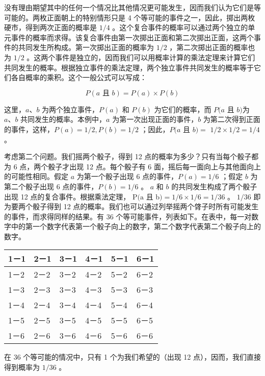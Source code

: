 没有理由期望其中的任何一个情况比其他情况更可能发生，因而我们认为它们是等可能的。两枚正面朝上的特别情形只是 4 个等可能的事件之一，因此，掷出两枚硬市，得到两次正面的概率是 $1 / 4$ 。这个复合事件的概率可以通过两个独立的单元事件的概率而求得。该复合事件由第一次掷出正面和第二次掷出正面，这两个事件的共同发生所构成。第一次掷出正面的概率为 $1 / 2$ ，第二次掷出正面的概率也为 $1 / 2$ 。这两个事件是独立的，因而我们可以用概率计算的乘法定理来计算它们共同发生的概率。根据独立事件的乘法定理，两个独立事件共同发生的概率等于它们各自概率的乘积。这个一般公式可以写成：

$$
P(a \text { 且 } b)=P(a) \times P(b)
$$

这里，$a 、 b$ 为两个独立事件，$P(a)$ 和 $P(b)$ 为它们的概率，而 $P(a$ 且 $b)$为 $a 、 b$ 共同发生的概率。本例中，$a$ 为第一次出现正面的事件，$b$ 为第二次得到正面的事件，这样，$P(a)=1 / 2, P(b)=1 / 2$ ；因此，$P(a$ 且 $b)=$ $1 / 2 \times 1 / 2=1 / 4$ 。

考虑第二个问题。我们摇两个骰子，得到 12 点的概率为多少？只有当每个骰子都为 6 点，两个骰子才出现 12 点。每个骰子有 6 面，摇后每一面向上与其他面向上的可能性相同。假定 $a$ 为第一个骰子出现 6 点的事件，$P(a)=1 / 6$ ；假定 $b$ 为第二个骰子出现 6 点的事件，$P(b)=1 / 6$ 。 $a$ 和 $b$ 的共同发生构成了两个骰子出现 12 点的复合事件。根据乘法定理， $\mathrm{P}(\mathrm{a}$ 且 b$)=1 / 6 \times 1 / 6=1 / 36$ 。 $1 / 36$ 即为要两个骰子得到 12 点的概率。我们也可以通过列举摇两个䏿子时所有可能发生的事件，而求得同样的结果。有 36 个等可能事件，列表如下。在表中，每一对数字中的第一个数字代表第一个骰子向上的数字，第二个数字代表第二个骰子向上的数字。

\begin{center}
\begin{tabular}{|l|l|l|l|l|l|}
\hline
1－1 & 2－1 & 3－1 & 4－1 & 5－1 & 6－1 \\
\hline
1－2 & 2－2 & 3－2 & 4－2 & 5－2 & 6－2 \\
\hline
1－3 & 2－3 & 3－3 & 4－3 & 5－3 & 6－3 \\
\hline
1－4 & 2－4 & 3－4 & 4－4 & 5－4 & 6－4 \\
\hline
1－5 & 2－5 & 3－5 & 4－5 & 5－5 & 6－5 \\
\hline
1－6 & 2－6 & 3－6 & 4－6 & 5－6 & 6－6 \\
\hline
\end{tabular}
\end{center}

在 36 个等可能的情况中，只有 1 个为我们希望的（出现 12 点），因而，我们直接得到概率为 $1 / 36$ 。

